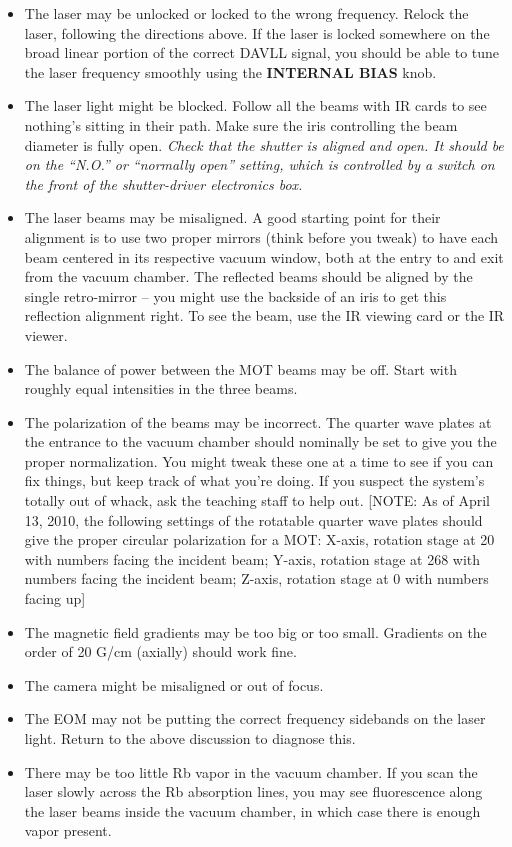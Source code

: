 \documentclass{../lab}
\begin{document}
\begin{itemize}
    \item The laser may be unlocked or locked to the wrong frequency. Relock the laser, following the directions above. If the laser is locked somewhere on the broad linear portion of the correct DAVLL signal, you should be able to tune the laser frequency smoothly using the \textbf{INTERNAL BIAS} knob.

    \item The laser light might be blocked. Follow all the beams with IR cards to see nothing's sitting in their path. Make sure the iris controlling the beam diameter is fully open. \emph{Check that the shutter is aligned and open. It should be on the ``N.O.'' or ``normally open'' setting, which is controlled by a switch on the front of the shutter-driver electronics box. }

    \item The laser beams may be misaligned. A good starting point for their alignment is to use two proper mirrors (think before you tweak) to have each beam centered in its respective vacuum window, both at the entry to and exit from the vacuum chamber. The reflected beams should be aligned by the single retro-mirror -- you might use the backside of an iris to get this reflection alignment right. To see the beam, use the IR viewing card or the IR viewer.

    \item The balance of power between the MOT beams may be off. Start with roughly equal intensities in the three beams.

    \item The polarization of the beams may be incorrect. The quarter wave plates at the entrance to the vacuum chamber should nominally be set to give you the proper normalization. You might tweak these one at a time to see if you can fix things, but keep track of what you're doing. If you suspect the system's totally out of whack, ask the teaching staff to help out. [NOTE: As of April 13, 2010, the following settings of the rotatable quarter wave plates should give the proper circular polarization for a MOT: X-axis, rotation stage at 20 with numbers facing the incident beam; Y-axis, rotation stage at 268 with numbers facing the incident beam; Z-axis, rotation stage at 0 with numbers facing up]

    \item The magnetic field gradients may be too big or too small. Gradients on the order of 20 G/cm (axially) should work fine.

    \item The camera might be misaligned or out of focus.

    \item The EOM may not be putting the correct frequency sidebands on the laser light. Return to the above discussion to diagnose this.

    \item There may be too little Rb vapor in the vacuum chamber. If you scan the laser slowly across the Rb absorption lines, you may see fluorescence along the laser beams inside the vacuum chamber, in which case there is enough vapor present.
\end{itemize}
\end{document}
